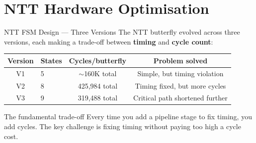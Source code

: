 \documentclass[aspectratio=169, 11pt]{beamer}
\begin{document}
\section{NTT Hardware Optimisation}

\begin{frame}{NTT FSM Design --- Three Versions}
The NTT butterfly evolved across three versions, each making a trade-off between \textbf{timing} and \textbf{cycle count}:

\vspace{0.4em}
\begin{center}
\begin{tabular}{clcc}
\toprule
\textbf{Version} & \textbf{States} & \textbf{Cycles/butterfly} & \textbf{Problem solved} \\
\midrule
V1 & 5  & $\sim$160K total & Simple, but timing violation \\
V2 & 8  & 425,984 total    & Timing fixed, but more cycles \\
V3 & 9  & 319,488 total    & Critical path shortened further \\
\bottomrule
\end{tabular}
\end{center}

\vspace{0.4em}
\begin{alertblock}{The fundamental trade-off}
Every time you add a pipeline stage to fix timing, you add cycles. The key challenge is fixing timing without paying too high a cycle cost.
\end{alertblock}
\end{frame}
\end{document}
